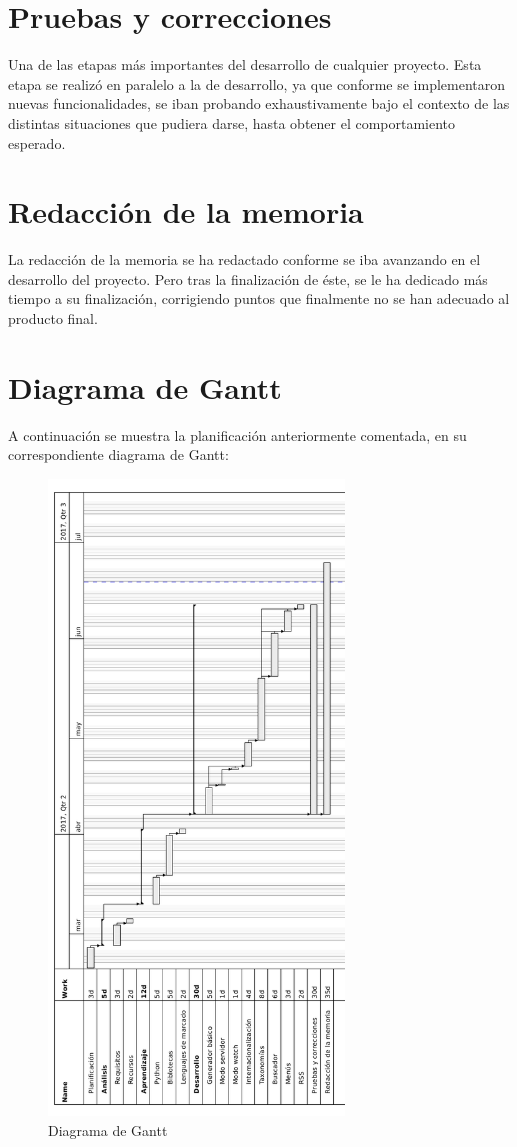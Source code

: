 \section{Pruebas y correcciones}

Una de las etapas más importantes del desarrollo de cualquier proyecto. Esta etapa se realizó en paralelo
a la de desarrollo, ya que conforme se implementaron nuevas funcionalidades, se iban probando exhaustivamente 
bajo el contexto de las distintas situaciones que pudiera darse, hasta obtener el comportamiento
esperado.

\section{Redacción de la memoria}

La redacción de la memoria se ha redactado conforme se iba avanzando en el desarrollo del proyecto.
Pero tras la finalización de éste, se le ha dedicado más tiempo a su finalización, corrigiendo puntos que
finalmente no se han adecuado al producto final.

\section{Diagrama de Gantt}

A continuación se muestra la planificación anteriormente comentada, en su correspondiente diagrama de
Gantt:


\begin{figure}[htbp]
    \centering
    \includegraphics[width=0.7\textwidth]{2_calendario/diagrama_gantt}
    \caption{Diagrama de Gantt}
    \label{fig:gantt}
\end{figure}
